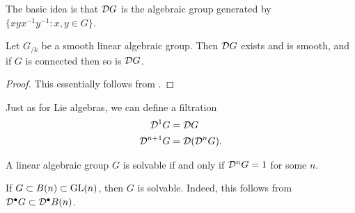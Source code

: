 The basic idea is that $\mathcal{D} G$ is the algebraic group generated by 
$\{x y x^{-1} y^{-1}:x,y\in G\}$. 

\begin{theorem}\label{thm:derived-nice}
Let $G_{/k}$ be a smooth linear algebraic group. Then $\mathcal{D} G$ exists and 
is smooth, and if $G$ is connected then so is $\mathcal{D} G$. 
\end{theorem}
\begin{proof}
This essentially follows from \cite[VI\textsubscript{B} 7.1]{sga3-i}. 
\end{proof}

Just as for Lie algebras, we can define a filtration 
\begin{align*}
  \mathcal{D}^1 G &= \mathcal{D} G \\
  \mathcal{D}^{n+1} G &= \mathcal{D}(\mathcal{D}^n G) .
\end{align*}

\begin{theorem}
A linear algebraic group $G$ is solvable if and only if $\mathcal{D}^n G=1$ for 
some $n$. 
\end{theorem}

\begin{example}
If $G\subset B(n)\subset \operatorname{GL}(n)$, then $G$ is solvable. Indeed, this 
follows from $\mathcal{D}^\bullet G\subset \mathcal{D}^\bullet B(n)$. 
\end{example}

